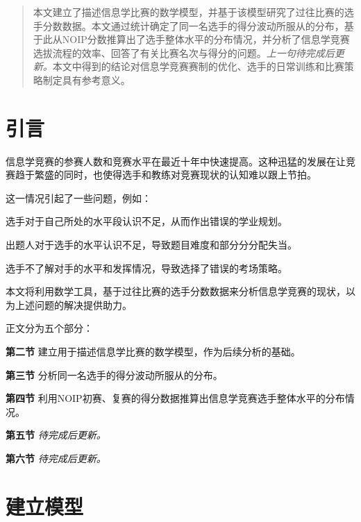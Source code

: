 \begin{abstract}
    本文建立了描述信息学比赛的数学模型，并基于该模型研究了过往比赛的选手分数数据。本文通过统计确定了同一名选手的得分波动所服从的分布，基于此从NOIP分数推算出了选手整体水平的分布情况，并分析了信息学竞赛选拔流程的效率、回答了有关比赛名次与得分的问题。\emph{上一句待完成后更新。}本文中得到的结论对信息学竞赛赛制的优化、选手的日常训练和比赛策略制定具有参考意义。
\end{abstract}

\section{引言}

    信息学竞赛的参赛人数和竞赛水平在最近十年中快速提高。这种迅猛的发展在让竞赛趋于繁盛的同时，也使得选手和教练对竞赛现状的认知难以跟上节拍。
    
    这一情况引起了一些问题，例如：

    \begin{asparaitem}
        \item {选手对于自己所处的水平段认识不足，从而作出错误的学业规划。}
        \item {出题人对于选手的水平认识不足，导致题目难度和部分分分配失当。}
        \item {选手不了解对手的水平和发挥情况，导致选择了错误的考场策略。}
    \end{asparaitem}

    本文将利用数学工具，基于过往比赛的选手分数数据来分析信息学竞赛的现状，以为上述问题的解决提供助力。

    \vspace{1.5ex}

    正文分为五个部分：

    \begin{asparaenum}
        \item [\textbf{第二节}]{建立用于描述信息学比赛的数学模型，作为后续分析的基础。}
        \item [\textbf{第三节}]{分析同一名选手的得分波动所服从的分布。}
        \item [\textbf{第四节}]{利用NOIP初赛、复赛的得分数据推算出信息学竞赛选手整体水平的分布情况。}
        \item [\textbf{第五节}]{\emph{待完成后更新。}}
        \item [\textbf{第六节}]{\emph{待完成后更新。}}
    \end{asparaenum}

\section{建立模型}

